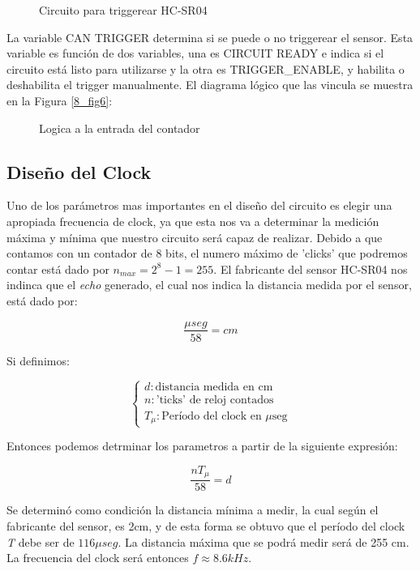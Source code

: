\begin{figure}[H]
\centering

\caption{Circuito para triggerear HC-SR04}
\label{8_fig3}
\end{figure}

La variable CAN TRIGGER determina si se puede o no triggerear el sensor. Esta variable es función de dos variables, una es CIRCUIT READY e indica si el circuito está listo para utilizarse y la otra es TRIGGER\_ENABLE, y habilita o deshabilita el trigger manualmente. El diagrama lógico que las vincula se muestra en la Figura \ref{8_fig6}:

\begin{figure}[H]
\centering

\caption{Logica a la entrada del contador} \label{8_fig5}
\end{figure}


\subsection*{Diseño del Clock}
Uno de los parámetros mas importantes en el diseño del circuito es elegir una apropiada frecuencia de clock, ya que esta nos va a determinar la medición máxima y mínima que nuestro circuito será capaz de realizar. Debido a que contamos con un contador de 8 bits, el numero máximo de 'clicks' que podremos contar está dado por $n_{max} = 2^8-1=255$.
El fabricante del sensor HC-SR04 nos indinca que el \emph{echo} generado, el cual nos indica la distancia medida por el sensor, está dado por:

\[\frac{\mu seg}{58} = cm \]

Si definimos:


\[
  \begin{cases}
    d:\text{distancia medida en cm }\\
    n:\text{'ticks' de reloj contados}\\
    T_{\mu}:\text{Período del clock en $\mu$seg}
  \end{cases}
\]

Entonces podemos detrminar los parametros a partir de la siguiente expresión:

\[ \frac{nT_{\mu}}{58}=d\]

Se determinó como condición la distancia mínima a medir, la cual según el fabricante del sensor, es 2cm, y de esta forma se obtuvo que el período del clock \emph{T} debe ser de $116 \mu seg$. La distancia máxima que se podrá medir será de 255 cm. La frecuencia del clock será entonces $f \approx 8.6kHz$.



